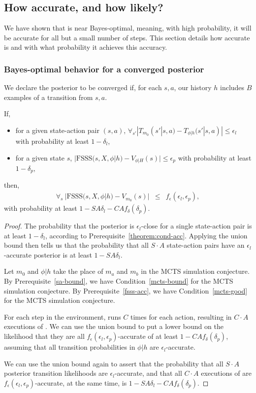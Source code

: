 \subsection{How accurate, and how likely?}

We have shown that  is near Bayes-optimal, meaning, with high probability, it will be accurate for all but a small number of steps. This section details how accurate  is and with what probability it achieves this accuracy.

\subsubsection{Bayes-optimal behavior for a converged posterior}
\label{sec-conv}
We declare the posterior to be converged if, for each $s,a$, our history $h$ includes $B$ examples of a transition from $s,a$.

\begin{lemma}
If,
\begin{itemize}
\item
for a given state-action pair $(s,a)$, $\forall_{s'} |T_{m_0}(s'|s,a) - T_{\phi|h}(s'|s,a)| \leq \epsilon_l$ with probability at least $1-\delta_l$,
\item
for a given state $s$, $|\mbox{FSSS}(s,X,\phi|h)-V_{\phi|H}(s)| \leq \epsilon_p$ with probability at least $1-\delta_p$,
\end{itemize}
then,
\begin{eqnarray}
\forall_s \ |\mbox{FSSS}(s,X,\phi|h) - V_{m_0}(s)| &\leq& f_\epsilon(\epsilon_l,\epsilon_p),
\end{eqnarray}
with probability at least $1-S A \delta_l - C A f_\delta(\delta_p)$.
\end{lemma}
\begin{proof}
The probability that the posterior is $\epsilon_l$-close for a single state-action pair is at least $1-\delta_l$, according to  Prerequisite~\ref{theorem:cond-acc}. Applying the union bound then tells us that the probability that all $S \cdot A$ state-action pairs have an $\epsilon_l$-accurate posterior is at least $1- SA \delta_l$.

Let $m_0$ and $\phi|h$ take the place of $m_a$ and $m_b$ in the MCTS simulation conjecture.
By Prerequisite~\ref{sa-bound}, we have Condition~\ref{mcts-bound} for the MCTS simulation conjecture. 
By Prerequisite~\ref{fsss-acc}, we have Condition~\ref{mcts-good} for the MCTS simulation conjecture.

For each step in the environment,  runs  $C$ times for each action, resulting in $C\cdot A$ executions of . We can use the union bound to put a lower bound on the likelihood that they are all $f_\epsilon(\epsilon_l, \epsilon_p)$-accurate of at least $1-CAf_\delta(\delta_{p})$, assuming that all transition probabilities in $\phi|h$ are $\epsilon_l$-accurate.

We can use the union bound again to assert that the probability that all $S\cdot A$ posterior transition likelihoods are $\epsilon_l$-accurate, and that all $C\cdot A$ executions of  are $f_\epsilon(\epsilon_l,\epsilon_p)$-accurate, at the same time, is $1 - SA \delta_l-CAf_\delta(\delta_p)$.
\end{proof}

